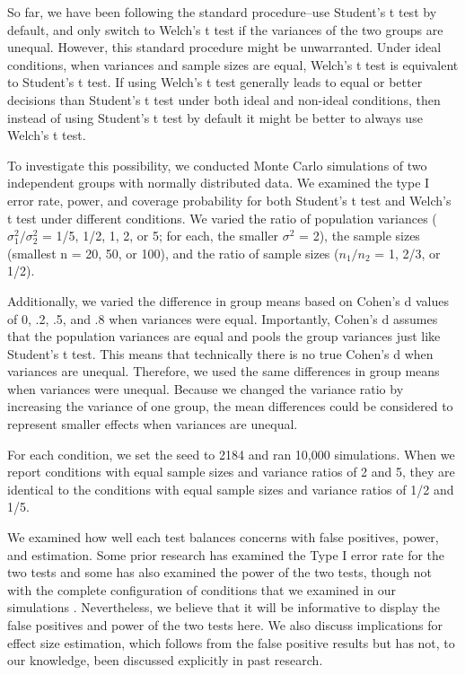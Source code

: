 \documentclass[man,a4paper,noextraspace,apacite]{apa6}
\begin{document}
    So far, we have been following the standard procedure--use Student's t test 
by default, and only switch to Welch's t test if the variances 
of the two groups are unequal. However, this standard procedure might be
unwarranted. Under ideal conditions, 
when variances and sample sizes are equal, Welch's t test is equivalent to 
Student's t test. If using Welch's t test generally leads to equal or better 
decisions than Student's t test under both ideal and non-ideal conditions, then 
instead of using Student's t test by default it might be better to always use 
Welch's t test.

    To investigate this possibility, we conducted Monte Carlo simulations of two independent groups with 
normally distributed data. We examined the type I error rate, power, and 
coverage probability for both Student's t test and Welch's t test under 
different conditions. We varied the ratio of population variances 
($\sigma_{1}^2/\sigma_{2}^2$ = 1/5, 1/2, 1, 2, or 5; for each, the smaller 
$\sigma^2$ = 2), the sample sizes (smallest n = 20, 50, or 100), and the ratio 
of sample sizes ($n_{1}/n_{2}$ = 1, 2/3, or 1/2). 
    
    Additionally, we varied the difference in group means based on Cohen's d 
values of 0, .2, .5, and .8 when variances were equal. Importantly, Cohen's d 
assumes that the population variances are equal and pools the group variances 
just like Student's t test. This means that technically there is no true 
Cohen's d when variances are unequal. Therefore, we used the same differences 
in group means when variances were unequal. Because we changed the variance 
ratio by increasing the variance of one group, the mean differences could be 
considered to represent smaller effects when variances are unequal.
    
    For each condition, we set the seed to 2184 and ran 10,000 simulations. 
When we report conditions with equal sample sizes and variance ratios of 2 and 
5, they are identical to the conditions with equal sample sizes and variance 
ratios of 1/2 and 1/5. 

    We examined how well each test balances concerns with 
false positives, power, and estimation. Some prior research has examined the 
Type I error rate for the two tests \cite{Boneau1960, Zimmerman1993, 
Zimmerman2004, Zimmerman1996, Zimmerman2009} and some has also examined the 
power of the two tests, though not with the complete configuration of 
conditions that we examined in our simulations \cite{Neuhauser2002, 
Zimmerman1993}. Nevertheless, we believe that it will be informative to display 
the false positives and power of the two tests here. We also discuss 
implications for effect size estimation, which follows from the false positive 
results but has not, to our knowledge, been discussed explicitly in past 
research.
    
\end{document}
